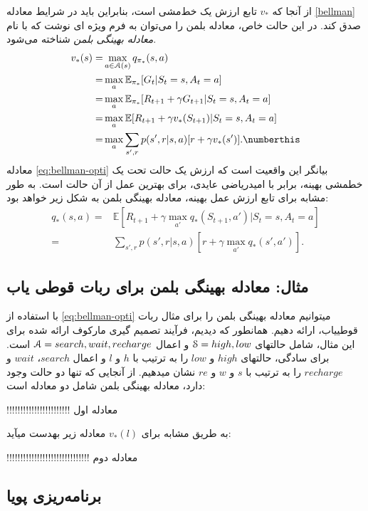 از آنجا که $v_*$ تابع ارزش یک خط‌مشی است، بنابراین باید در شرایط معادله \ref{bellman} صدق کند.
در این حالت خاص، معادله بلمن را می‌توان به فرم ویژه ای نوشت که با نام
 \textit{معادله بهینگی بلمن}
شناخته می‌شود.
\begin{align}
  v_{*}(s)= &\max_{a \in \EuScript{A}(s)} q_{\pi_*}(s,a) \nonumber \\
      =& \max_{a} \mathbb{E}_{\pi_*} [G_t|S_t=s, A_t=a] \nonumber \\ 
      =& \max_{a} \mathbb{E}_{\pi_*} [R_{t+1} + \gamma G_{t+1} | S_t=s, A_t=a] \nonumber \\ 
      =& \max_{a} \mathbb{E} [R_{t+1} + \gamma v_*(S_{t+1}) | S_t= s, A_t = a] \nonumber \\
      =& \max_{a} \sum_{s',r} p(s',r|s,a) [r + \gamma v_*(s')]. \numberthis
\label{eq:bellman-opti}
\end{align}
معادله 
\ref{eq:bellman-opti}
 بیانگر این واقعیت است که ارزش یک حالت تحت یک خط\nf مشی بهینه، برابر با امیدریاضی عایدی، برای بهترین عمل از آن حالت است. به طور مشابه برای تابع ارزش عمل بهینه، معادله بهینگی بلمن به شکل زیر خواهد بود:
\begin{align}
q_*(s,a) =& \mathbb{E}\left[R_{t+1} + \gamma \max_{a'} q_*(S_{t+1},a')| S_t=s, A_t=a \right] \nonumber\\
=& \sum_{s',r} p(s',r|s,a) \left[r + \gamma \max_{a'} q_*(s',a')\right] 
\label{eq:2}.
\end{align}

\subsection{مثال: معادله بهینگی بلمن برای ربات قوطی یاب}
با استفاده از 
\ref{eq:bellman-opti}
می\nf توانیم معادله بهینگی بلمن را برای مثال ربات قوطی\nf یاب، ارائه دهیم. همانطور که دیدیم، فرآیند تصمیم گیری مارکوف ارائه شده برای این مثال، شامل حالت\nf های 
$\EuScript{S} = {high, low}$
و اعمال 
$\EuScript{A} = {search, wait, recharge}$
است.
برای سادگی، حالت\nf های $high$ و $low$ را به ترتیب با $h$ و $l$ و اعمال $search$،
$wait$
و
$recharge$
را به ترتیب با $s$ و $w$ و $re$ نشان می\nf دهیم. از آنجایی که تنها دو حالت وجود دارد، معادله بهینگی بلمن شامل دو معادله است:


!!!!!!!!!!!!!!!!!!!!!!! معادله اول


به طریق مشابه برای 
$v_*(l)$
معادله زیر به\nf دست می\nf آید:


!!!!!!!!!!!!!!!!!!!!!!!!!!!!!! معادله دوم
\subsection{برنامه‌ریزی پویا}

